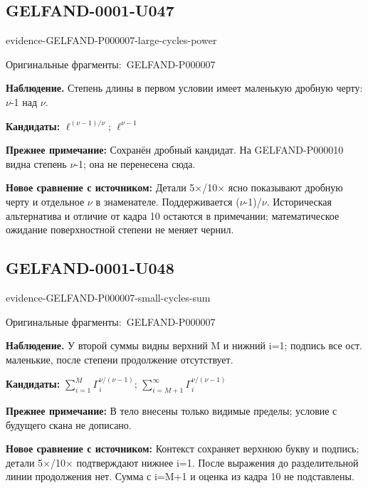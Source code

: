 \documentclass[11pt]{article}
\newcommand{\EvidenceBlock}[4]{%
 \par\smallskip\noindent\begin{minipage}{\linewidth}
 \begin{minipage}[t]{.47\linewidth}\vspace{0pt}\centering
 \csname evidence-#1-#2\endcsname\par
 {\scriptsize\SourceCropCaption\ #1}\par
 \end{minipage}\hfill
 \begin{minipage}[t]{.49\linewidth}\vspace{0pt}\raggedright
 {\small\color{orange!65!black}\textbf{#4} #3}\par
 \end{minipage}
 \end{minipage}\par\smallskip}
\newcommand{\SourceCropCaption}{Оригинальные фрагменты:}\newcommand{\ReadingCaption}{Сомнительное чтение.}\newcommand{\IncompleteCaption}{Неразобранный фрагмент.}\newcommand{\DiagramCaption}{Рисунок и набранное описание.}
\begin{document}
\subsection*{GELFAND-0001-U047}
\EvidenceBlock{GELFAND-P000007}{large-cycles-power}{Степень длины в первом условии имеет маленькую дробную черту: \(\nu\)-1 над \(\nu\).}{Наблюдение.}
\par\smallskip\noindent\textbf{Кандидаты: } \(\ell^{(\nu-1)/\nu}\); \(\ell^{\nu-1}\)\par
\par\smallskip\noindent\textbf{Прежнее примечание: } Сохранён дробный кандидат. На GELFAND-P000010 видна степень \(\nu\)-1; она не перенесена сюда.\par
\par\smallskip\noindent\textbf{Новое сравнение с источником: } Детали 5×/10× ясно показывают дробную черту и отдельное \(\nu\) в знаменателе. Поддерживается (\(\nu\)-1)/\(\nu\). Историческая альтернатива и отличие от кадра 10 остаются в примечании; математическое ожидание поверхностной степени не меняет чернил.\par

\subsection*{GELFAND-0001-U048}
\EvidenceBlock{GELFAND-P000007}{small-cycles-sum}{У второй суммы видны верхний M и нижний i=1; подпись все ост. маленькие, после степени продолжение отсутствует.}{Наблюдение.}
\par\smallskip\noindent\textbf{Кандидаты: } \(\sum_{i=1}^{M}\Gamma_i^{\nu/(\nu-1)}\); \(\sum_{i=M+1}^{\infty}\Gamma_i^{\nu/(\nu-1)}\)\par
\par\smallskip\noindent\textbf{Прежнее примечание: } В тело внесены только видимые пределы; условие с будущего скана не дописано.\par
\par\smallskip\noindent\textbf{Новое сравнение с источником: } Контекст сохраняет верхнюю букву и подпись; детали 5×/10× подтверждают нижнее i=1. После выражения до разделительной линии продолжения нет. Сумма с i=M+1 и оценка из кадра 10 не подставлены.\par
\end{document}
